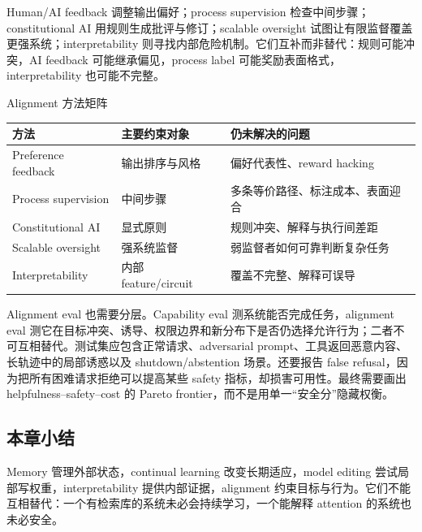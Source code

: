 Human/AI feedback 调整输出偏好；process supervision 检查中间步骤；constitutional AI 用规则生成批评与修订；scalable oversight 试图让有限监督覆盖更强系统；interpretability 则寻找内部危险机制。它们互补而非替代：规则可能冲突，AI feedback 可能继承偏见，process label 可能奖励表面格式，interpretability 也可能不完整。




\begin{knowledgebox}{Alignment 方法矩阵}
\begin{tabularx}{\textwidth}{p{}p{}X}
\toprule
方法 & 主要约束对象 & 仍未解决的问题 \\
\midrule
Preference feedback & 输出排序与风格 & 偏好代表性、reward hacking \\
Process supervision & 中间步骤 & 多条等价路径、标注成本、表面迎合 \\
Constitutional AI & 显式原则 & 规则冲突、解释与执行间差距 \\
Scalable oversight & 强系统监督 & 弱监督者如何可靠判断复杂任务 \\
Interpretability & 内部 feature/circuit & 覆盖不完整、解释可误导 \\
\bottomrule
\end{tabularx}
\end{knowledgebox}

Alignment eval 也需要分层。Capability eval 测系统能否完成任务，alignment eval 测它在目标冲突、诱导、权限边界和新分布下是否仍选择允许行为；二者不可互相替代。测试集应包含正常请求、adversarial prompt、工具返回恶意内容、长轨迹中的局部诱惑以及 shutdown/abstention 场景。还要报告 false refusal，因为把所有困难请求拒绝可以提高某些 safety 指标，却损害可用性。最终需要画出 helpfulness--safety--cost 的 Pareto frontier，而不是用单一“安全分”隐藏权衡。

\subsection{本章小结}

Memory 管理外部状态，continual learning 改变长期适应，model editing 尝试局部写权重，interpretability 提供内部证据，alignment 约束目标与行为。它们不能互相替代：一个有检索库的系统未必会持续学习，一个能解释 attention 的系统也未必安全。

